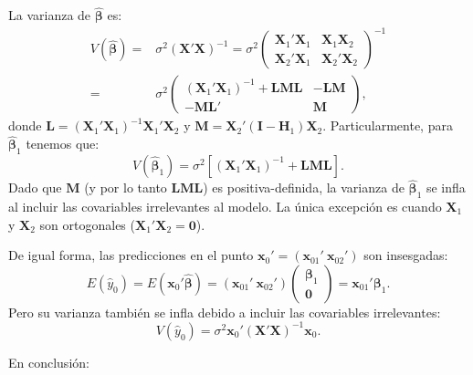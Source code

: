 \documentclass[
]{article}
\begin{document}
La varianza de \(\widehat{\boldsymbol \beta}\) es:
\begin{equation}
\begin{split}
V(\widehat{\boldsymbol \beta}) =& \sigma^{2}(\boldsymbol X'\boldsymbol X)^{-1} = \sigma^{2}\begin{pmatrix}
\boldsymbol X_{1}'\boldsymbol X_{1} & \boldsymbol X_{1}\boldsymbol X_{2} \\ \boldsymbol X_{2}'\boldsymbol X_{1} & \boldsymbol X_{2}'\boldsymbol X_{2}
\end{pmatrix}^{-1} \\
=& \sigma^{2} \begin{pmatrix}
(\boldsymbol X_{1}'\boldsymbol X_{1})^{-1} + \boldsymbol L\boldsymbol M\boldsymbol L& - \boldsymbol L\boldsymbol M\\
-\boldsymbol M\boldsymbol L' & \boldsymbol M
\end{pmatrix},
\end{split}
\nonumber
\end{equation}
donde \(\boldsymbol L= (\boldsymbol X_{1}'\boldsymbol X_{1})^{-1}\boldsymbol X_{1}'\boldsymbol X_{2}\) y \(\boldsymbol M= \boldsymbol X_{2}'(\boldsymbol I- \boldsymbol H_{1})\boldsymbol X_{2}\). Particularmente, para \(\widehat{\boldsymbol \beta}_1\) tenemos que:
\[
V(\widehat{\boldsymbol \beta}_{1}) = \sigma^{2} \left[ (\boldsymbol X_{1}'\boldsymbol X_{1})^{-1} + \boldsymbol L\boldsymbol M\boldsymbol L\right].
\]
Dado que \(\boldsymbol M\) (y por lo tanto \(\boldsymbol L\boldsymbol M\boldsymbol L\)) es positiva-definida, la varianza de \(\widehat{\boldsymbol \beta}_{1}\) se infla al incluir las covariables irrelevantes al modelo. La única excepción es cuando \(\boldsymbol X_{1}\) y \(\boldsymbol X_{2}\) son ortogonales (\(\boldsymbol X_{1}'\boldsymbol X_{2} = \boldsymbol 0\)).

De igual forma, las predicciones en el punto \(\boldsymbol x_{0}' = (\boldsymbol x_{01}' \ \boldsymbol x_{02}')\) son insesgadas:
\[
E(\widehat{y}_{0}) = E(\boldsymbol x_{0}'\widehat{\boldsymbol \beta}) = (\boldsymbol x_{01}' \ \boldsymbol x_{02}')\begin{pmatrix}
\boldsymbol \beta_{1} \\ \boldsymbol 0
\end{pmatrix} = \boldsymbol x_{01}'\boldsymbol \beta_{1}.
\]
Pero su varianza también se infla debido a incluir las covariables irrelevantes:
\[
V(\widehat{y}_{0}) = \sigma^{2} \boldsymbol x_{0}'(\boldsymbol X'\boldsymbol X)^{-1}\boldsymbol x_{0}.
\]

En conclusión:
\end{document}
